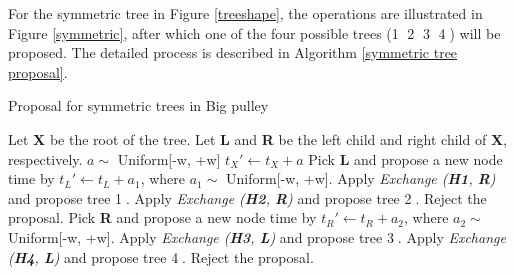 \documentclass{bmcart}
\begin{document}
For the symmetric tree in Figure \ref{treeshape}, the operations are illustrated in Figure \ref{symmetric}, after which one of the four possible trees (\textcircled1 \textcircled2 \textcircled3 \textcircled4) will be proposed. The detailed process is described in Algorithm \ref{symmetric tree proposal}.

\begin{algorithm}
\caption{Proposal for symmetric trees in Big pulley}
\label{symmetric tree proposal}
\begin{algorithmic}
\STATE {}
\STATE Let \textbf{X} be the root of the tree.
\STATE Let \textbf{L} and \textbf{R} be the left child and right child of \textbf{X}, respectively.
\STATE {}
\STATE $a \sim$ Uniform[-w, +w]
\STATE ${t_X}' \leftarrow {t_X} + a$
\STATE {}
\STATE Pick \textbf{L} and propose a new node time by ${t_L}'  \leftarrow {t_L} + {a_1}$, where ${a_1} \sim$ Uniform[-w, +w]. 
\STATE Apply \textit{Exchange (\textbf{H1}, \textbf{R})} and propose tree \textcircled1.
\ELSE
\STATE Apply \textit{Exchange (\textbf{H2}, \textbf{R})} and propose tree \textcircled2.
\ENDIF
\ELSE
\STATE Reject the proposal.
\ENDIF
\ELSE
\STATE Pick \textbf{R} and propose a new node time by ${t_R}'  \leftarrow {t_R} + {a_2}$, where ${a_2} \sim$ Uniform[-w, +w]. 
\STATE Apply \textit{Exchange (\textbf{H3}, \textbf{L})} and propose tree \textcircled3.
\ELSE
\STATE Apply \textit{Exchange (\textbf{H4}, \textbf{L})} and propose tree \textcircled4.
\ENDIF
\ELSE
\STATE Reject the proposal.
\ENDIF
\ENDIF
\STATE {} 
\STATE {}
\end{algorithmic}
\end{algorithm}
\end{document}
